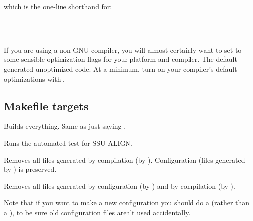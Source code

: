
which is the one-line shorthand for:

\\
\\

If you are using a non-GNU compiler, you will almost certainly want to
set  to some sensible optimization flags for your
platform and compiler. The  default generated unoptimized
code. At a minimum, turn on your compiler's default optimizations with
.

\begin{comment}
\subsection{Example configuration}

The Intel GNU/Linux version installed at Janelia Farm is configured as
follows:

{\scriptuser{env CFLAGS="-O3" ./configure --enable-mpi --enable-lfs --prefix=/usr/local/infernal-1}}
\end{comment}

\subsection{Makefile targets}

\begin{sreitems}{}
\item[\emprog{all}]
  Builds everything. Same as just saying .

\item[\emprog{check}]
  Runs the automated test for SSU-ALIGN.

\item[\emprog{clean}]
  Removes all files generated by compilation (by
  ). Configuration (files generated by
  ) is preserved.

\item[\emprog{distclean}]
  Removes all files generated by configuration (by )
  and by compilation (by ). 

  Note that if you want to make a new configuration you
  should do a  (rather than a ), to be sure old configuration files aren't used
  accidentally.
\end{sreitems}

